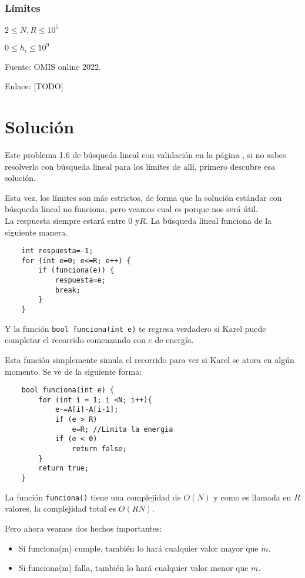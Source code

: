 \subsubsection*{Límites}
\begin{plimits}
	\item \(2\leq N, R \leq 10^5\)
	\item \(0\leq h_i\leq 10^9\)
\end{plimits}

Fuente: OMIS online 2022.

Enlace: [TODO]

\section*{Solución}
Este problema 1.6 de búsqueda lineal con validación en la página \pageref{bicicleta}, si no sabes resolverlo con búsqueda lineal para los límites de allí, primero descubre esa solución.

Esta vez, los límites son más estrictos, de forma que la solución estándar con búsqueda lineal no funciona, pero veamos cual es porque nos será útil.
\\

La respuesta siempre estará entre \(0\)  y\(R\). La búsqueda lineal funciona de la siguiente manera.
\begin{lstlisting}
	int respuesta=-1;
	for (int e=0; e<=R; e++) {
		if (funciona(e)) {
			respuesta=e;
			break;
		}
	}
\end{lstlisting}

Y la función \verb|bool funciona(int e)| te regresa verdadero si Karel puede completar el recorrido comenzando con \(e\) de energía.

Esta función simplemente simula el recorrido para ver si Karel se atora en algún momento. Se ve de la siguiente forma:

\begin{lstlisting}
	bool funciona(int e) {
		for (int i = 1; i <N; i++){
			e-=A[i]-A[i-1];
			if (e > R) 
				e=R; //Limita la energia
			if (e < 0)
				return false;			
		}
		return true;
	}
\end{lstlisting}

La función \verb|funciona()| tiene una complejidad de \(O(N)\) y como es llamada en \(R\) valores, la complejidad total es \(O(RN)\).

Pero ahora veamos dos hechos importantes:
\begin{itemize}
	\item Si funciona(m) cumple, también lo hará cualquier valor mayor que \(m\).
	\item Si funciona(m) falla, también lo hará cualquier valor menor que \(m\).
\end{itemize}

